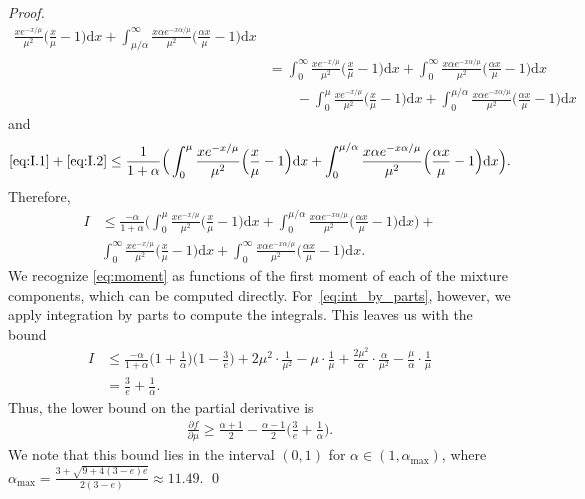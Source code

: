 \documentclass[10pt,a4paper]{amsart}
\newcommand{\diff}{\mathrm{d}}
\begin{document}
\begin{proof}
\begin{align*}
        \frac{x e^{-x/\mu}}{\mu^2}\Big( \frac{x}{\mu} - 1\Big) \diff x
        + \int_{\mu / \alpha}^\infty \frac{x \alpha e^{-x \alpha /\mu}}{\mu^2}\Big( \frac{\alpha x}{\mu} - 1\Big) \diff x
      \\ &
           =\int_0^\infty \frac{x e^{-x/\mu}}{\mu^2}\Big( \frac{x}{\mu} - 1\Big) \diff x
           + \int_0^\infty \frac{x \alpha e^{-x \alpha /\mu}}{\mu^2}\Big( \frac{\alpha x}{\mu} - 1\Big) \diff x
      \\
      &\qquad
        - \int_0^\mu\frac{x e^{-x/\mu}}{\mu^2}\Big( \frac{x}{\mu} - 1\Big) \diff x
        + \int_0^{\mu /\alpha} \frac{x \alpha e^{-x \alpha /\mu}}{\mu^2}\Big( \frac{\alpha x}{\mu} - 1\Big) \diff x
    \end{align*}
    and
    \begin{align*}
      \eqref{eq:I.1} + \eqref{eq:I.2}
      \leq \frac{1}{1+\alpha} \Big(
      \int_0^\mu\frac{x e^{-x/\mu}}{\mu^2}\Big( \frac{x}{\mu} - 1\Big)\diff x
      +  \int_0^{\mu / \alpha} \frac{x \alpha e^{-x \alpha /\mu}}{\mu^2}\Big( \frac{\alpha x}{\mu} - 1\Big) \diff x \Big).
    \end{align*}
    Therefore,
    \begin{align}
        I& \leq
           \frac{-\alpha}{1+\alpha}
           \Big(
           \int_0^\mu\frac{x e^{-x/\mu}}{\mu^2}\Big( \frac{x}{\mu} - 1\Big)\diff x
           +  \int_0^{\mu / \alpha} \frac{x \alpha e^{-x \alpha /\mu}}{\mu^2}\Big( \frac{\alpha x}{\mu} - 1\Big) \diff x
           \Big)
           + \label{eq:int_by_parts}
      \\ &
           \int_0^\infty\frac{x e^{-x/\mu}}{\mu^2}\Big( \frac{x}{\mu} - 1\Big) \diff x
           +
           \int_0^\infty \frac{x \alpha e^{-x \alpha /\mu}}{\mu^2}\Big( \frac{\alpha x}{\mu} - 1\Big) \diff x.
           \label{eq:moment}
    \end{align}
    We recognize \eqref{eq:moment} as functions of the first moment of each of the
    mixture components, which can be computed directly.
    For~\eqref{eq:int_by_parts}, however, we apply integration by parts to
    compute the integrals.
    This leaves us with the bound
    \begin{align*}
      I
      & \leq
        \frac{-\alpha}{1+\alpha}\Big(1+\frac{1}{\alpha}\Big) \Big( 1- \frac{3}{e}\Big)
        + 2\mu^2\cdot\frac{1}{\mu^2} - \mu\cdot \frac{1}{\mu}
        + \frac{2\mu^2}{\alpha}\cdot\frac{\alpha}{\mu^2}-\frac{\mu}{\alpha}\cdot \frac{1}{\mu}
      \\
      &= \frac{3}{e}+\frac{1}{\alpha}.
    \end{align*}
    Thus, the lower bound on the partial derivative is
    \begin{align*}
      \frac{\partial f}{\partial \mu}
      \geq
      \frac{\alpha +1}{2} -\frac{\alpha -1}{2} \Big( \frac{3}{e} + \frac{1}{\alpha}\Big).
    \end{align*}
    We note that this bound lies in the interval $(0,1)$ for $\alpha \in
    (1,\alpha_{\max})$, where $\alpha_{\max} = \frac{3+\sqrt{9+4(3-e)e}}{2(3-e)}
    \approx 11.49$.
    \qed
  \end{proof}
\end{document}
